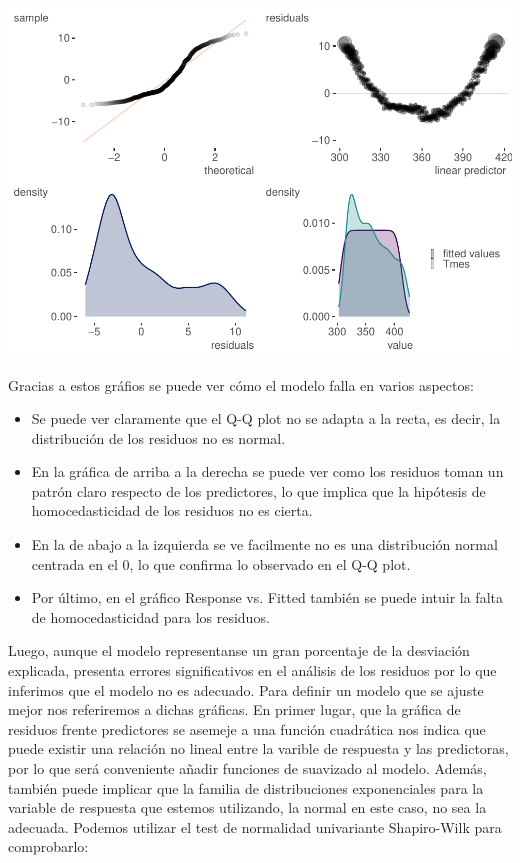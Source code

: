 \documentclass[12pt,a4paper,]{book}
\numberwithin{dummy}{section}
\theoremstyle{ocrenumbox}
\theoremstyle{blacknumex}
\theoremstyle{blacknumbox}
\theoremstyle{ocrenum}
\theoremstyle{ocrenum}
\begin{document}
\begin{center}\includegraphics[width=0.95\linewidth]{figurasR/unnamed-chunk-26-1} \end{center}

Gracias a estos gráfios se puede ver cómo el modelo falla en varios
aspectos:

\begin{itemize}
  \item Se puede ver claramente que el Q-Q plot no se adapta a la recta, es decir, la distribución de los residuos no es normal.
  \item En la gráfica de arriba a la derecha se puede ver como los residuos toman un patrón claro respecto de los predictores, lo que implica que la hipótesis de homocedasticidad de los residuos no es cierta.
  \item En la de abajo a la izquierda se ve facilmente no es una distribución normal centrada en el 0, lo que confirma lo observado en el Q-Q plot.
  \item Por último, en el gráfico Response vs. Fitted también se puede intuir la falta de homocedasticidad para los residuos. 
\end{itemize}

Luego, aunque el modelo representanse un gran porcentaje de la
desviación explicada, presenta errores significativos en el análisis de
los residuos por lo que inferimos que el modelo no es adecuado. Para
definir un modelo que se ajuste mejor nos referiremos a dichas gráficas.
En primer lugar, que la gráfica de residuos frente predictores se
asemeje a una función cuadrática nos indica que puede existir una
relación no lineal entre la varible de respuesta y las predictoras, por
lo que será conveniente añadir funciones de suavizado al modelo. Además,
también puede implicar que la familia de distribuciones exponenciales
para la variable de respuesta que estemos utilizando, la normal en este
caso, no sea la adecuada. Podemos utilizar el test de normalidad
univariante Shapiro-Wilk para comprobarlo:
\end{document}
